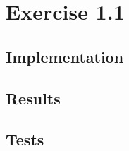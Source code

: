 \section{Exercise 1.1}

\subsection{Implementation}
\newpage

\subsection{Results}
\newpage

\subsection{Tests}
\newpage
